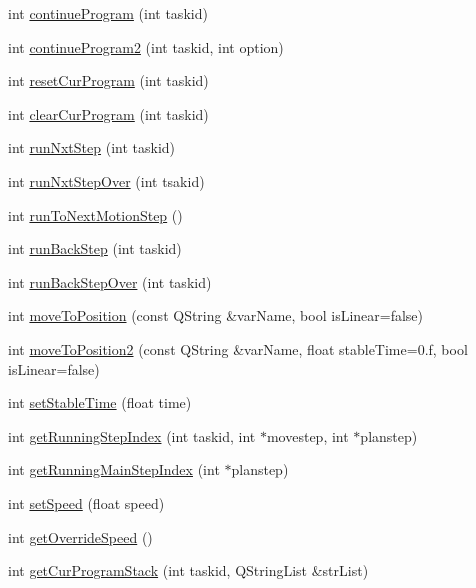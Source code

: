 \begin{DoxyCompactItemize}
\item 
int \hyperlink{classCNRobo_a8ab603cd4f9c8c0f243ef90e3bab8f06}{continue\-Program} (int taskid)
\item 
int \hyperlink{classCNRobo_ac1a4839307044c7c1e5402d48fdb896d}{continue\-Program2} (int taskid, int option)
\item 
int \hyperlink{classCNRobo_a21cb95010ac7d1cf619de3d26dff68d2}{reset\-Cur\-Program} (int taskid)
\item 
int \hyperlink{classCNRobo_aef5b7db574317b6d3205416abd57e0fe}{clear\-Cur\-Program} (int taskid)
\item 
int \hyperlink{classCNRobo_adab4cbebe7bbb47ec7d6b026767df699}{run\-Nxt\-Step} (int taskid)
\item 
int \hyperlink{classCNRobo_a406d9a9ce0286fab0d9eab13fabd7a38}{run\-Nxt\-Step\-Over} (int tsakid)
\item 
int \hyperlink{classCNRobo_a067f2f332d1c4e0c87006fc7db9f4f5b}{run\-To\-Next\-Motion\-Step} ()
\item 
int \hyperlink{classCNRobo_a295228d7e9fcd8a945fa648ff89a985e}{run\-Back\-Step} (int taskid)
\item 
int \hyperlink{classCNRobo_a4f44ebeb73072f4de07b37c90ec99261}{run\-Back\-Step\-Over} (int taskid)
\item 
int \hyperlink{classCNRobo_a18f7e2aedef8a83e773d525400c066f2}{move\-To\-Position} (const Q\-String \&var\-Name, bool is\-Linear=false)
\item 
int \hyperlink{classCNRobo_a738949ca5859f8866ebffe9c12c3983d}{move\-To\-Position2} (const Q\-String \&var\-Name, float stable\-Time=0.f, bool is\-Linear=false)
\item 
int \hyperlink{classCNRobo_aa9dad2af3948ffbf0378a560dbd93d4a}{set\-Stable\-Time} (float time)
\item 
int \hyperlink{classCNRobo_a82076d7aaa06fb8652b0d75a7d7e8b46}{get\-Running\-Step\-Index} (int taskid, int $\ast$movestep, int $\ast$planstep)
\item 
int \hyperlink{classCNRobo_a6ea807e42ba8e98257783cb77cec94fe}{get\-Running\-Main\-Step\-Index} (int $\ast$planstep)
\item 
int \hyperlink{classCNRobo_a93e636dc7fc80cd7eddb2e44d0ec7a99}{set\-Speed} (float speed)
\item 
int \hyperlink{classCNRobo_ace49bb85b4fc7f36ca5800fd6f1a5654}{get\-Override\-Speed} ()
\item 
int \hyperlink{classCNRobo_a7a63b942c2ddad145f85730bf7592305}{get\-Cur\-Program\-Stack} (int taskid, Q\-String\-List \&str\-List)

\end{DoxyCompactItemize}
